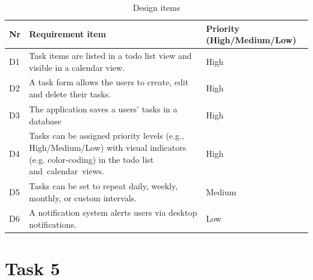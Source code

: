 \documentclass{article}
\begin{document}
\begin{table}[h]
  \centering
  \begin{tabularx}{\textwidth}{l|X|l}
    \toprule
    \textbf{Nr} & \textbf{Requirement item}                                                                                                                     & \textbf{Priority (High/Medium/Low)} \\
    \hline\hline
    D1          & Task items are listed in a todo list view and visible in a calendar view.                                                                     & High                                \\
    \hline
    D2          & A task form allows the users to create, edit and delete their tasks.                                                                          & High                                \\
    \hline
    D3          & The application saves a users' tasks in a database                                                                                            & High                                \\
    \hline
    D4          & Tasks can be assigned priority levels (e.g., High/Medium/Low) with visual indicators (e.g. color-coding) in the todo list and calendar views. & High                                \\
    \hline
    D5          & Tasks can be set to repeat daily, weekly, monthly, or custom intervals.                                                                       & Medium                              \\
    \hline
    D6          & A notification system alerts users via desktop notifications.                                                                                 & Low                                 \\
    \bottomrule
  \end{tabularx}
  \caption{Design items}
  \label{Design items}
\end{table}

\clearpage

\section{Task 5}
\end{document}
